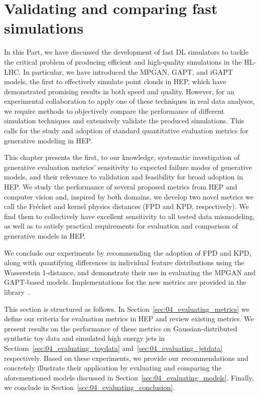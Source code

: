 \chapter{Validating and comparing fast simulations}
\label{sec:04_evaluating}


In this Part, we have discussed the development of fast DL simulators to tackle the critical problem of producing efficient and high-quality simulations in the HL-LHC.
In particular, we have introduced the MPGAN, GAPT, and iGAPT models, the first to effectively simulate point clouds in HEP, which have demonstrated promising results in both speed and quality.
However, for an experimental collaboration to apply one of these techniques in real data analyses, we require methods to objectively compare the performance of different simulation techniques and extensively validate the produced simulations.
This calls for the study and adoption of standard quantitative evaluation metrics for generative modeling in HEP.

This chapter presents the first, to our knowledge, systematic investigation of generative evaluation metrics' sensitivity to expected failure modes of generative models, and their relevance to validation and feasibility for broad adoption in HEP.
We study the performance of several proposed metrics from HEP and computer vision and, inspired by both domains, we develop two novel metrics we call the Fr\'echet and kernel physics distances (FPD and KPD, respectively).
We find them to collectively have excellent sensitivity to all tested data mismodeling, as well as to satisfy practical requirements for evaluation and comparison of generative models in HEP.

We conclude our experiments by recommending the adoption of FPD and KPD, along with quantifying differences in individual feature distributions using the Wasserstein 1-distance, and demonstrate their use in evaluating the MPGAN and GAPT-based models.
Implementations for the new metrics are provided in the \jetnet library~\cite{kansal_jetnet_library}.

This section is structured as follows.
In Section~\ref{sec:04_evaluating_metrics} we define our criteria for evaluation metrics in HEP and review existing metrics.
We present results on the performance of these metrics on Gaussian-distributed synthetic toy data and simulated high energy jets in Sections~\ref{sec:04_evaluating_toydata} and~\ref{sec:04_evaluating_jetdata} respectively.
Based on these experiments, we provide our recommendations and concretely illustrate their application by evaluating and comparing the aforementioned models discussed in Section~\ref{sec:04_evaluating_models}.
Finally, we conclude in Section~\ref{sec:04_evaluating_conclusion}.


